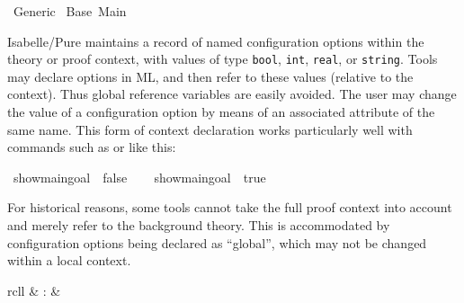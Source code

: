 %
\begin{isabellebody}%
\def\isabellecontext{Generic}%
%
\isadelimtheory
%
\endisadelimtheory
%
\isatagtheory
{}\isamarkupfalse%
\ Generic\isanewline
{}\ Base\ Main\isanewline
{}%
\endisatagtheory
{\isafoldtheory}%
%
\isadelimtheory
%
\endisadelimtheory
%
\isamarkuptrue%
%
\isamarkuptrue%
%
\begin{isamarkuptext}%
Isabelle/Pure maintains a record of named configuration
  options within the theory or proof context, with values of type
  \verb|bool|, \verb|int|, \verb|real|, or \verb|string|.  Tools may declare options in ML, and then refer to these
  values (relative to the context).  Thus global reference variables
  are easily avoided.  The user may change the value of a
  configuration option by means of an associated attribute of the same
  name.  This form of context declaration works particularly well with
  commands such as \hyperlink{command.declare}{\mbox{}} or \hyperlink{command.using}{\mbox{}} like
  this:%
\end{isamarkuptext}%
\isamarkuptrue%
\isamarkupfalse%
\ {}{}show{}main{}goal\ {}\ false{}{}\isanewline
\isanewline
{}\isamarkupfalse%
\isanewline
{}\isanewline
%
\isadelimproof
\ \ %
\endisadelimproof
%
\isatagproof
{}\isamarkupfalse%
\ {}{}show{}main{}goal\ {}\ true{}{}%
\endisatagproof
{\isafoldproof}%
%
\isadelimproof
\isanewline
%
\endisadelimproof
{}\isamarkupfalse%
%
\begin{isamarkuptext}%
For historical reasons, some tools cannot take the full proof
  context into account and merely refer to the background theory.
  This is accommodated by configuration options being declared as
  ``global'', which may not be changed within a local context.

  \begin{matharray}{rcll}
    \hypertarget{command.print-configs}{\hyperlink{command.print-configs}{\mbox{}}} & : &  \\
  \end{matharray}


\end{isamarkuptext}
\end{isabellebody}

